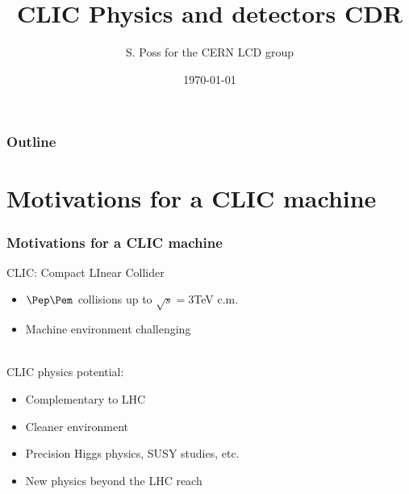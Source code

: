 \documentclass{beamer}
\author{S. Poss for the CERN LCD group}
\institute[CERN]{CERN}
\title[]{CLIC Physics and detectors CDR}
\date{\today}
\begin{document}
{

\begin{frame}
	\titlepage
\end{frame}

\begin{frame}
\frametitle{Outline}
\tableofcontents
\end{frame}
}

\section[Motivations for CLIC]{Motivations for a CLIC machine}%
\begin{frame}
 \frametitle{Motivations for a CLIC machine}
 CLIC: Compact LInear Collider
 \begin{itemize}
   \item $\Pep\Pem$ collisions up to $\sqrt{s}=3$TeV c.m.
   \item Machine environment challenging
\end{itemize}
~\\
CLIC physics potential:
\begin{itemize}
   \item Complementary to LHC
   \item Cleaner environment
   \item Precision Higgs physics, SUSY studies, etc.
   \item New physics beyond the LHC reach
 \end{itemize}
 
\end{frame}
\end{document}
